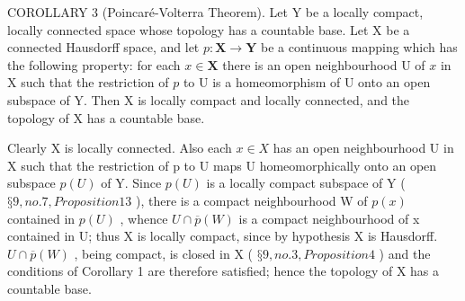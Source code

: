 COROLLARY 3 (Poincaré-Volterra Theorem). Let Y be a locally compact, locally connected space whose topology has a countable base. Let X be a connected Hausdorff space, and let \(p: \mathbf{X} \to \mathbf{Y}\) be a continuous mapping which has the following property: for each \(x \in \mathbf{X}\) there is an open neighbourhood U of \(x\) in X such that the restriction of \(p\) to U is a homeomorphism of U onto an open subspace of Y. Then X is locally compact and locally connected, and the topology of X has a countable base.

Clearly X is locally connected. Also each \(x \in X\) has an open neighbourhood U in X such that the restriction of p to U maps U homeomorphically onto an open subspace \(p(U)\) of Y. Since \(p(U)\) is a locally compact subspace of Y ( \(§ 9, no. 7, Proposition 13\) ), there is a compact neighbourhood W of \(p(x)\) contained in \(p(U)\) , whence \(U \cap \overline{p}(W)\) is a compact neighbourhood of x contained in U; thus X is locally compact, since by hypothesis X is Hausdorff. \(U \cap \overline{p}(W)\) , being compact, is closed in X ( \(§ 9, no. 3, Proposition 4\) ) and the conditions of Corollary 1 are therefore satisfied; hence the topology of X has a countable base.

